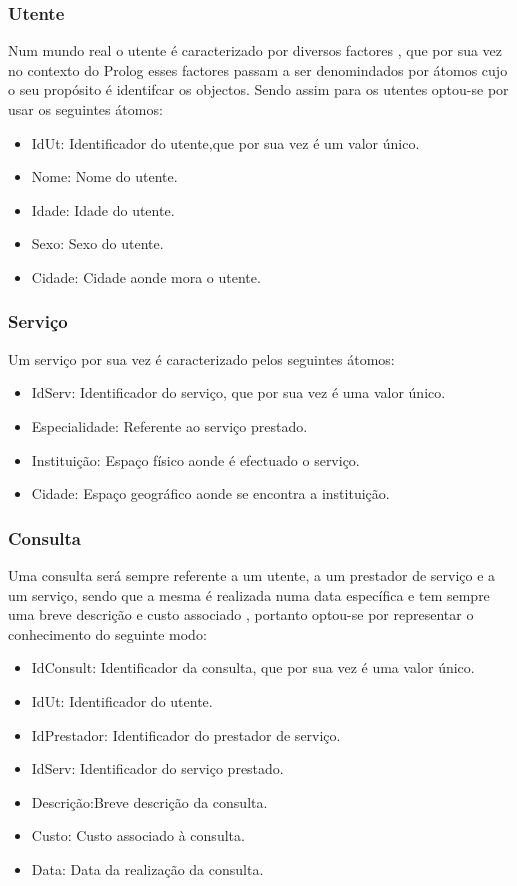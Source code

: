 \documentclass[25pt]{article}
\begin{document}
\subsubsection{Utente}
Num mundo real o utente é caracterizado por diversos factores , que por sua vez no contexto do Prolog esses factores passam a ser denomindados por átomos cujo o seu propósito é identifcar os objectos. Sendo assim para os utentes optou-se por usar os seguintes átomos:


 \begin{itemize}
  \item IdUt: Identificador do utente,que por sua vez é um valor único.
  \item Nome: Nome do utente.
  \item Idade: Idade do utente.
  \item Sexo: Sexo do utente.
  \item Cidade: Cidade aonde mora o utente.
\end{itemize}

\subsubsection{Serviço}
Um serviço por sua vez é  caracterizado pelos seguintes átomos:
\begin{itemize}
  \item IdServ: Identificador do serviço, que por sua vez é uma valor único.
  \item Especialidade: Referente ao serviço prestado.
  \item Instituição: Espaço físico aonde é efectuado o serviço.
  \item Cidade: Espaço geográfico aonde se encontra a instituição.
\end{itemize}

\subsubsection{Consulta}
Uma consulta será sempre referente a um utente, a um prestador de serviço e a um serviço, sendo que a mesma é realizada numa data específica e tem sempre uma breve descrição e custo associado , portanto optou-se por representar o conhecimento do seguinte modo:

\begin{itemize}
  \item IdConsult: Identificador da consulta, que por sua vez é uma valor único.
  \item IdUt: Identificador do utente.
  \item IdPrestador: Identificador do prestador de serviço.
  \item IdServ: Identificador do serviço prestado.
  \item Descrição:Breve descrição da consulta.
  \item Custo: Custo associado à consulta.
  \item Data: Data da realização da consulta.
\end{itemize}
\end{document}
